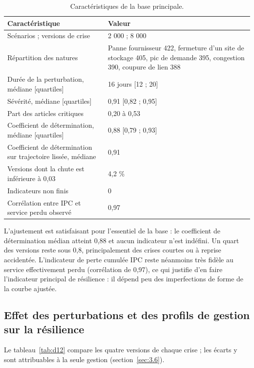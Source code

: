 \begin{table}[htbp]
\caption{Caractéristiques de la base principale.}
\label{tab:d11}
\footnotesize
\begin{tabularx}{\textwidth}{@{}LL@{}}
\toprule
\textbf{Caractéristique} & \textbf{Valeur} \\
\midrule
Scénarios ; versions de crise & 2 000 ; 8 000 \\
Répartition des natures & Panne fournisseur 422, fermeture d'un site de stockage 405, pic de demande 395, congestion 390, coupure de lien 388 \\
Durée de la perturbation, médiane [quartiles] & 16 jours [12 ; 20] \\
Sévérité, médiane [quartiles] & 0,91 [0,82 ; 0,95] \\
Part des articles critiques & 0,20 à 0,53 \\
Coefficient de détermination, médiane [quartiles] & 0,88 [0,79 ; 0,93] \\
Coefficient de détermination sur trajectoire lissée, médiane & 0,91 \\
Versions dont la chute est inférieure à 0,03 & 4,2 \% \\
Indicateurs non finis & 0 \\
Corrélation entre IPC et service perdu observé & 0,97 \\
\bottomrule
\end{tabularx}
\end{table}

L'ajustement est satisfaisant pour l'essentiel de la base : le coefficient de détermination médian atteint 0,88 et aucun indicateur n'est indéfini. Un quart des versions reste sous 0,8, principalement des crises courtes ou à reprise accidentée. L'indicateur de perte cumulée IPC reste néanmoins très fidèle au service effectivement perdu (corrélation de 0,97), ce qui justifie d'en faire l'indicateur principal de résilience : il dépend peu des imperfections de forme de la courbe ajustée.

\subsection{Effet des perturbations et des profils de gestion sur la résilience}
\label{sec:6.2}

Le tableau~\ref{tab:d12} compare les quatre versions de chaque crise ; les écarts y sont attribuables à la seule gestion (section~\ref{sec:3.6}).

